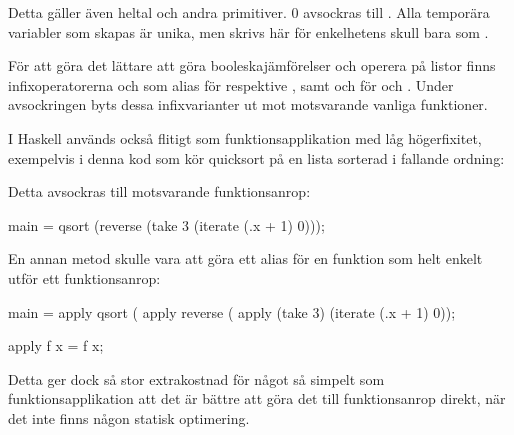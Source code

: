 \documentclass[../Core]{subfiles}
\begin{document}
Detta gäller även heltal och andra primitiver. $0$ avsockras till
. Alla temporära variabler som skapas är unika, men skrivs här för enkelhetens
skull bara som .
            
    
För att göra det lättare att göra booleskajämförelser och operera på listor
 finns infixoperatorerna \ic{\&\&} och \ic{||} som alias för  respektive ,
samt \ic{++} och \ic{:} för  och . Under avsockringen byts dessa
infixvarianter ut mot motsvarande vanliga funktioner. 


I Haskell används också \ic{\$} flitigt som funktionsapplikation med låg
högerfixitet, exempelvis i denna kod som kör quicksort på en
lista sorterad i fallande ordning:


Detta avsockras till motsvarande funktionsanrop:

\begin{codeEx}
main = qsort (reverse (take 3 (iterate (\x.x + 1) 0)));
\end{codeEx}

En annan metod skulle vara att göra \ic{\$} ett alias för en funktion  som
helt enkelt utför ett funktionsanrop:

\begin{codeEx}
main = apply qsort 
     ( apply reverse 
     ( apply (take 3) (iterate (\x.x + 1) 0));

apply f x = f x;
\end{codeEx}

Detta ger dock så stor extrakostnad för något så simpelt som funktionsapplikation
att det är bättre att göra det till funktionsanrop direkt, när det inte finns
någon statisk optimering.
        


\end{document}

